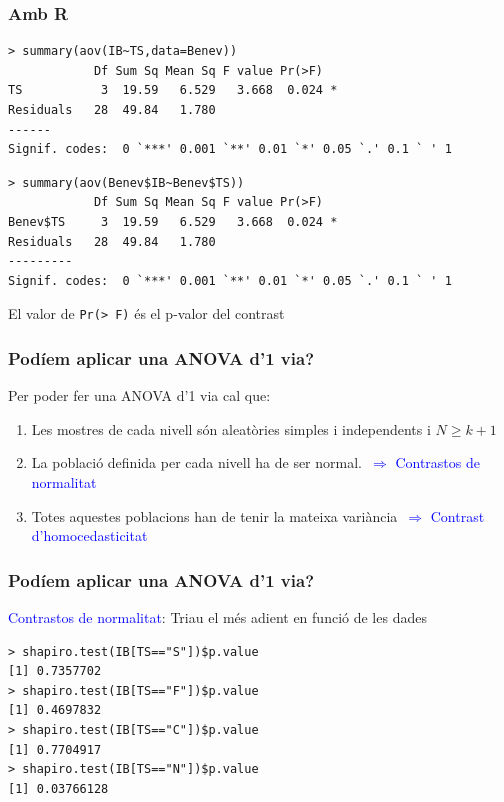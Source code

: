\documentclass[12pt,t]{beamer}
\newcommand{\blue}[1]{\textcolor{blue}{#1}}
\renewcommand{\geq}{\geqslant}
\theoremstyle{plain}
\theoremstyle{definition}
\begin{document}
\begin{frame}[fragile]
\frametitle{Amb R} 

\begin{lstlisting}
> summary(aov(IB~TS,data=Benev))
            Df Sum Sq Mean Sq F value Pr(>F)  
TS           3  19.59   6.529   3.668  0.024 *
Residuals   28  49.84   1.780                 
------
Signif. codes:  0 `***' 0.001 `**' 0.01 `*' 0.05 `.' 0.1 ` ' 1
\end{lstlisting}

\begin{lstlisting}
> summary(aov(Benev$IB~Benev$TS))
            Df Sum Sq Mean Sq F value Pr(>F)  
Benev$TS     3  19.59   6.529   3.668  0.024 *
Residuals   28  49.84   1.780                 
---------
Signif. codes:  0 `***' 0.001 `**' 0.01 `*' 0.05 `.' 0.1 ` ' 1
\end{lstlisting}\medskip


El valor de {\tt Pr(> F)} és el p-valor del contrast
\end{frame}



\begin{frame}
\frametitle{Podíem aplicar una ANOVA d'1 via?}\vspace*{-3ex}

Per poder fer una ANOVA d'1 via cal que:\medskip

\begin{enumerate}
\item Les mostres de cada nivell són aleatòries simples i independents i $N\geq k+1$\pause
\medskip

\item La població definida per cada nivell ha de ser normal.\pause\ \blue{$\Rightarrow$ Contrastos de normalitat}
\pause\medskip

\item Totes aquestes poblacions han de tenir la mateixa variància\pause\ \blue{$\Rightarrow$ Contrast d'homocedasticitat} 
\end{enumerate}
\end{frame}

\begin{frame}[fragile]
\frametitle{Podíem aplicar una ANOVA d'1 via?}\vspace*{-3ex}

\blue{Contrastos de normalitat}: Triau el més adient en funció de les dades\medskip

\begin{lstlisting}
> shapiro.test(IB[TS=="S"])$p.value
[1] 0.7357702
> shapiro.test(IB[TS=="F"])$p.value
[1] 0.4697832
> shapiro.test(IB[TS=="C"])$p.value
[1] 0.7704917
> shapiro.test(IB[TS=="N"])$p.value
[1] 0.03766128
\end{lstlisting}
\end{frame}
\end{document}
